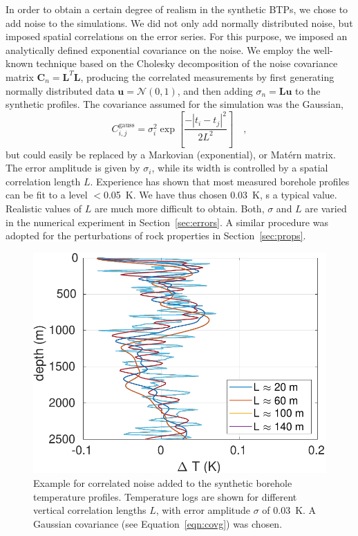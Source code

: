 \documentclass[cp]{copernicus}
\begin{document}
In order to obtain a certain degree of realism in the synthetic BTPs, we chose to add noise to the 
simulations. We did not only add normally distributed noise, but imposed spatial correlations on 
the error series. For this purpose, we imposed an analytically defined exponential covariance on the 
noise.  We employ the well-known technique \cite[see, ][]{Martinez2016a} based on the Cholesky 
decomposition of the noise covariance matrix $\mathbf{C}_{n}=\mathbf{L}^T\mathbf{L}$, producing the 
correlated measurements by first generating normally distributed data $\mathbf{u}=\mathcal{N}(0,1)$, 
and then adding $\sigma_n = \mathbf{L}\mathbf{u}$ to the synthetic profiles. The covariance assumed 
for the simulation was the Gaussian, 
\begin{equation}\label{eqn:covg}
C_{i,j}^{{\text{gauss}}} = \sigma _i^2\exp \left[ {\frac{{ - {{\left| {{t_i} - 
{t_j}} \right|}^2}}}{{2{L^2}}}} \right] \quad , 
\end{equation}  
\noindent but could easily be replaced by a Markovian (exponential), or Mat\'ern matrix. The error 
amplitude is given by $\sigma_i$, while its width is controlled by a spatial correlation 
length $L$. Experience has shown that most measured borehole profiles can be fit to a level 
$<$0.05~K. We have thus chosen 0.03~K, s a typical value. Realistic values of $L$ are much more 
difficult to obtain. Both, $\sigma$ and $L$ are varied in the numerical experiment in 
Section~\ref{sec:errors}. A similar procedure was adopted for the perturbations of rock properties 
in Section~\ref{sec:props}.


\begin{figure}%
 \centering
 \includegraphics[width=0.95\columnwidth]{Figures/Figure_NoiseCorr}
 \caption{Example for correlated noise added to the synthetic borehole temperature profiles. 
Temperature logs are shown for different vertical correlation lengths $L$, with error amplitude 
$\sigma$ of 0.03~K. A Gaussian covariance (see Equation~\ref{eqn:covg}) was chosen.}
\label{fig:Noise}
\end{figure}
\end{document}
